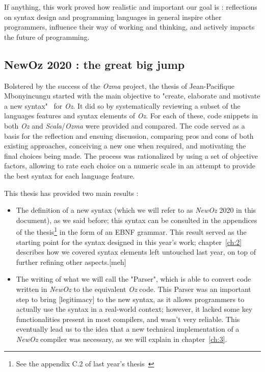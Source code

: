 If anything, this work proved how realistic and important our goal is : reflections on syntax design and programming languages in general inspire other programmers, influence their way of working and thinking, and actively impacts the future of programming.

\subsection{NewOz 2020 : the great big jump}\label{subsec:ch1-newoz2020}
Bolstered by the success of the \textit{Ozma} project, the thesis of Jean-Pacifique Mbonyincungu started with the main objective to "create, elaborate and motivate a new syntax"~\cite{jpthesis} for \textit{Oz}.
It did so by systematically reviewing a subset of the languages features and syntax elements of \textit{Oz}.
For each of these, code snippets in both \textit{Oz} and \textit{Scala}/\textit{Ozma} were provided and compared.
The code served as a basis for the reflection and ensuing discussion, comparing pros and cons of both existing approaches, conceiving a new one when required, and motivating the final choices being made.
The process was rationalized by using a set of objective factors, allowing to rate each choice on a numeric scale in an attempt to provide the best syntax for each language feature.\newline

This thesis has provided two main results :
\begin{itemize}
    \item The definition of a new syntax (which we will refer to as \textit{NewOz} 2020 in this document), as we said before;
    this syntax can be consulted in the appendices of the thesis\footnote{See the appendix C.2 of last year's thesis~\cite{jpthesis}} in the form of an EBNF grammar.
    This result served as the starting point for the syntax designed in this year's work;
    chapter~\ref{ch:2} describes how we covered syntax elements left untouched last year, on top of further refining other aspects.[meh]
    \item The writing of what we will call the "Parser", which is able to convert code written in \textit{NewOz} to the equivalent \textit{Oz} code.
    This Parser was an important step to bring [legitimacy] to the new syntax, as it allows programmers to actually use the syntax in a real-world context;
    however, it lacked some key functionalities present in most compilers, and wasn't very reliable.
    This eventually lead us to the idea that a new technical implementation of a \textit{NewOz} compiler was necessary, as we will explain in chapter~\ref{ch:3}.
\end{itemize}

